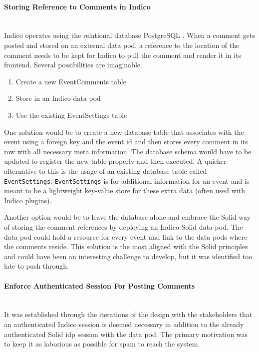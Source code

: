 \paragraph{Storing Reference to Comments in Indico}\mbox{}\\

Indico operates using the relational database PostgreSQL \cite{postgresql}. When a comment gets posted and stored on an external data pod, a reference to the location of the comment needs to be kept for Indico to pull the comment and render it in its frontend. Several possibilities are imaginable. 

\begin{enumerate}
    \item Create a new EventComments table
    \item Store in an Indico data pod 
    \item Use the existing EventSettings table
\end{enumerate}

One solution would be to create a new database table that associates with the event using a foreign key and the event id and then stores every comment in its row with all necessary meta information. The database schema would have to be updated to register the new table properly and then executed. A quicker alternative to this is the usage of an existing database table called \texttt{EventSettings}. \texttt{EventSettings} is for additional information for an event and is meant to be a lightweight key-value store for these extra data (often used with Indico plugins).

Another option would be to leave the database alone and embrace the Solid way of storing the comment references by deploying an Indico Solid data pod. The data pod could hold a resource for every event and link to the data pods where the comments reside. This solution is the most aligned with the Solid principles and could have been an interesting challenge to develop, but it was identified too late to push through.
\vspace{0.5cm}
\paragraph{Enforce Authenticated Session For Posting Comments}\mbox{}\\

It was established through the iterations of the design with the stakeholders that an authenticated Indico session is deemed necessary in addition to the already authenticated Solid \gls{idp} session with the data pod. The primary motivation was to keep it as laborious as possible for spam to reach the system.

